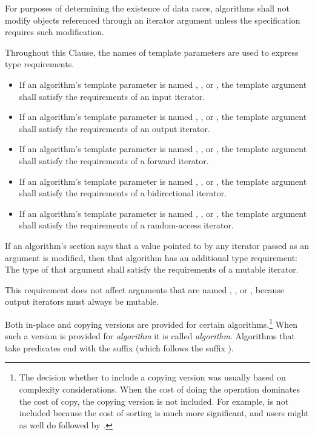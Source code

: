 \pnum
For purposes of determining the existence of data races, algorithms shall
not modify objects referenced through an iterator argument unless the
specification requires such modification.

\pnum
Throughout this Clause, the names of template parameters
are used to express type requirements.
\begin{itemize}
\item
If an algorithm's template parameter is named
,
,
or
,
the template argument shall satisfy the
requirements of an input iterator.
\item
If an algorithm's template parameter is named
,
,
or
,
the template argument shall satisfy the requirements
of an output iterator.
\item
If an algorithm's template parameter is named
,
,
or
,
the template argument shall satisfy the requirements
of a forward iterator.
\item
If an algorithm's template parameter is named
,
,
or
,
the template argument shall satisfy the requirements
of a bidirectional iterator.
\item
If an algorithm's template parameter is named
,
,
or
,
the template argument shall satisfy the requirements
of a random-access iterator.
\end{itemize}

\pnum
If an algorithm's
\effects
section says that a value pointed to by any iterator passed
as an argument is modified, then that algorithm has an additional
type requirement:
The type of that argument shall satisfy the requirements
of a mutable iterator.
\begin{note}
This requirement does not affect arguments that are named
,
,
or
,
because output iterators must always be mutable.
\end{note}

\pnum
Both in-place and copying versions are provided for certain
algorithms.\footnote{The decision whether to include a copying version was
usually based on complexity considerations. When the cost of doing the operation
dominates the cost of copy, the copying version is not included. For example,
 is not included because the cost of sorting is much more
significant, and users might as well do  followed by .}
When such a version is provided for \textit{algorithm} it is called
\textit{algorithm}. Algorithms that take predicates end with the
suffix  (which follows the suffix ).

